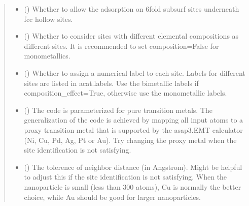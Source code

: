 \documentclass[letterpaper,10pt,english]{sphinxmanual}
\begin{document}
\begin{fulllineitems}
\begin{quote}
\begin{description}
\begin{itemize}
\item {} 
 (\sphinxstyleliteralemphasis{\sphinxupquote{, }}) \textendash{} Whether to allow the adsorption on 6\sphinxhyphen{}fold subsurf sites
underneath fcc hollow sites.

\item {} 
 (\sphinxstyleliteralemphasis{\sphinxupquote{, }}) \textendash{} Whether to consider sites with different elemental
compositions as different sites. It is recommended to
set composition=False for monometallics.

\item {} 
 (\sphinxstyleliteralemphasis{\sphinxupquote{, }}) \textendash{} Whether to assign a numerical label to each site.
Labels for different sites are listed in acat.labels.
Use the bimetallic labels if composition\_effect=True,
otherwise use the monometallic labels.

\item {} 
 (\sphinxstyleliteralemphasis{\sphinxupquote{, }}) \textendash{} The code is parameterized for pure transition metals.
The generalization of the code is achieved by mapping all
input atoms to a proxy transition metal that is supported
by the asap3.EMT calculator (Ni, Cu, Pd, Ag, Pt or Au).
Try changing the proxy metal when the site identification
is not satisfying.

\item {} 
 (\sphinxstyleliteralemphasis{\sphinxupquote{, }}) \textendash{} The tolerence of neighbor distance (in Angstrom).
Might be helpful to adjust this if the site identification
is not satisfying. When the nanoparticle is small (less
than 300 atoms), Cu is normally the better choice, while
Au should be good for larger nanoparticles.

\end{itemize}


\end{description}
\end{quote}
\end{fulllineitems}
\end{document}
